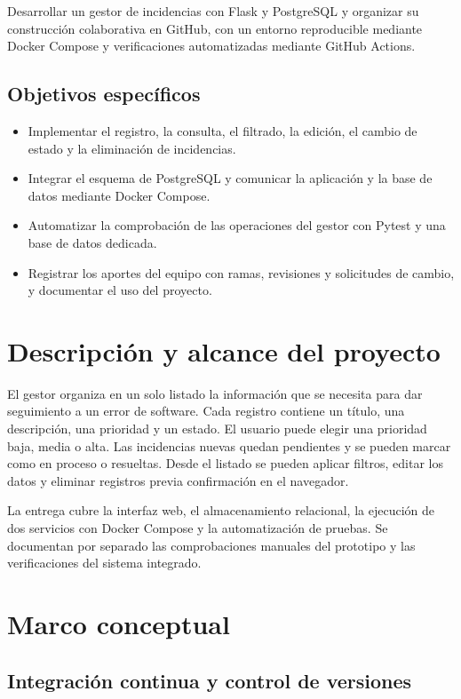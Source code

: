 \documentclass[12pt,letterpaper]{article}
\begin{document}
Desarrollar un gestor de incidencias con Flask y PostgreSQL y organizar su construcción colaborativa en GitHub, con un entorno reproducible mediante Docker Compose y verificaciones automatizadas mediante GitHub Actions.

\subsection{Objetivos específicos}

\begin{itemize}
  \item Implementar el registro, la consulta, el filtrado, la edición, el cambio de estado y la eliminación de incidencias.
  \item Integrar el esquema de PostgreSQL y comunicar la aplicación y la base de datos mediante Docker Compose.
  \item Automatizar la comprobación de las operaciones del gestor con Pytest y una base de datos dedicada.
  \item Registrar los aportes del equipo con ramas, revisiones y solicitudes de cambio, y documentar el uso del proyecto.
\end{itemize}

\section{Descripción y alcance del proyecto}

El gestor organiza en un solo listado la información que se necesita para dar seguimiento a un error de software. Cada registro contiene un título, una descripción, una prioridad y un estado. El usuario puede elegir una prioridad baja, media o alta. Las incidencias nuevas quedan pendientes y se pueden marcar como en proceso o resueltas. Desde el listado se pueden aplicar filtros, editar los datos y eliminar registros previa confirmación en el navegador.

La entrega cubre la interfaz web, el almacenamiento relacional, la ejecución de dos servicios con Docker Compose y la automatización de pruebas. Se documentan por separado las comprobaciones manuales del prototipo y las verificaciones del sistema integrado.

\section{Marco conceptual}

\subsection{Integración continua y control de versiones}
\end{document}
